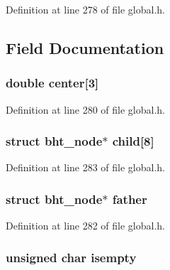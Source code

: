 Definition at line 278 of file global.\-h.



\subsection{Field Documentation}
\hypertarget{structbht__node_a9da2c4f10aed3a86628aad3dd87c9d6a}{
\subsubsection[{center}]{\setlength{\rightskip}{0pt plus 5cm}double center\mbox{[}3\mbox{]}}}\label{structbht__node_a9da2c4f10aed3a86628aad3dd87c9d6a}


Definition at line 280 of file global.\-h.

\hypertarget{structbht__node_a79d661ac20d812ad17b1d7455ad9e031}{
\subsubsection[{child}]{\setlength{\rightskip}{0pt plus 5cm}struct {\bf bht\-\_\-node}$\ast$ child\mbox{[}8\mbox{]}}}\label{structbht__node_a79d661ac20d812ad17b1d7455ad9e031}


Definition at line 283 of file global.\-h.

\hypertarget{structbht__node_ad327b7e4aaac3a9687feb283d05fabbe}{
\subsubsection[{father}]{\setlength{\rightskip}{0pt plus 5cm}struct {\bf bht\-\_\-node}$\ast$ father}}\label{structbht__node_ad327b7e4aaac3a9687feb283d05fabbe}


Definition at line 282 of file global.\-h.

\hypertarget{structbht__node_a3aa7881ee7de66da41c4eeacb9280836}{
\subsubsection[{isempty}]{\setlength{\rightskip}{0pt plus 5cm}unsigned char isempty}}\label{structbht__node_a3aa7881ee7de66da41c4eeacb9280836}


